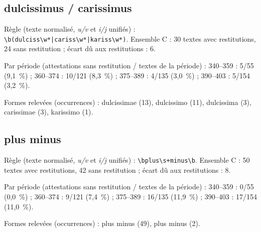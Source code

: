 \subsection*{dulcissimus / carissimus}
\noindent Règle (texte normalisé, \textit{u/v} et \textit{i/j} unifiés) : \texttt{\small \textbackslash{}b(\allowbreak{}dulciss\textbackslash{}w*|\allowbreak{}cariss\textbackslash{}w*|\allowbreak{}kariss\textbackslash{}w*)}. Ensemble C : 30 textes avec restitutions, 24 sans restitution ; écart dû aux restitutions : 6.\par
\noindent Par période (attestations sans restitution / textes de la période) : 340–359 : 5/55 (9,1~\%) ; 360–374 : 10/121 (8,3~\%) ; 375–389 : 4/135 (3,0~\%) ; 390–403 : 5/154 (3,2~\%).\par
\noindent Formes relevées (occurrences) : dulcissimae (13), dulcissimo (11), dulcissima (3), carissimae (3), karissimo (1).\par
{}\par\medskip
\subsection*{plus minus}
\noindent Règle (texte normalisé, \textit{u/v} et \textit{i/j} unifiés) : \texttt{\small \textbackslash{}bplus\textbackslash{}s+minus\textbackslash{}b}. Ensemble C : 50 textes avec restitutions, 42 sans restitution ; écart dû aux restitutions : 8.\par
\noindent Par période (attestations sans restitution / textes de la période) : 340–359 : 0/55 (0,0~\%) ; 360–374 : 9/121 (7,4~\%) ; 375–389 : 16/135 (11,9~\%) ; 390–403 : 17/154 (11,0~\%).\par
\noindent Formes relevées (occurrences) : plus minus (49), plus   minus (2).\par
{}\par\medskip

